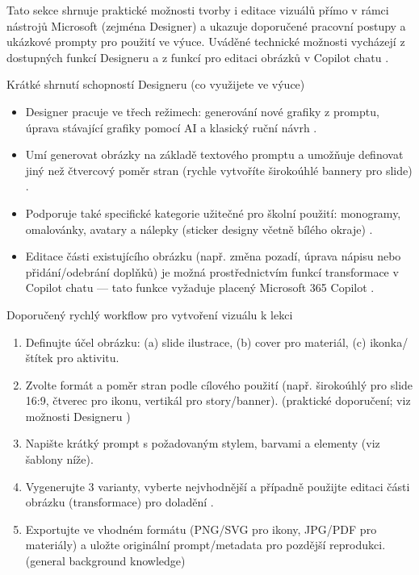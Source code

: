 Tato sekce shrnuje praktické možnosti tvorby i editace vizuálů přímo v rámci nástrojů Microsoft (zejména Designer) a ukazuje doporučené pracovní postupy a ukázkové prompty pro použití ve výuce. Uváděné technické možnosti vycházejí z dostupných funkcí Designeru a z funkcí pro editaci obrázků v Copilot chatu \cite{kb_ai_101_tipu_pdf_04e4a115_page_51_1,kb_ai_101_tipu_pdf_04e4a115_page_52_2}.

Krátké shrnutí schopností Designeru (co využijete ve výuce)
\begin{itemize}
  \item Designer pracuje ve třech režimech: generování nové grafiky z promptu, úprava stávající grafiky pomocí AI a klasický ruční návrh \cite{kb_ai_101_tipu_pdf_04e4a115_page_51_1}.
  \item Umí generovat obrázky na základě textového promptu a umožňuje definovat jiný než čtvercový poměr stran (rychle vytvoříte širokoúhlé bannery pro slide) \cite{kb_ai_101_tipu_pdf_04e4a115_page_51_1}.
  \item Podporuje také specifické kategorie užitečné pro školní použití: monogramy, omalovánky, avatary a nálepky (sticker designy včetně bílého okraje) \cite{kb_ai_101_tipu_pdf_04e4a115_page_51_1}.
  \item Editace části existujícího obrázku (např. změna pozadí, úprava nápisu nebo přidání/odebrání doplňků) je možná prostřednictvím funkcí transformace v Copilot chatu — tato funkce vyžaduje placený Microsoft 365 Copilot \cite{kb_ai_101_tipu_pdf_04e4a115_page_52_2}.
\end{itemize}

Doporučený rychlý workflow pro vytvoření vizuálu k lekci
\begin{enumerate}
  \item Definujte účel obrázku: (a) slide ilustrace, (b) cover pro materiál, (c) ikonka/štítek pro aktivitu.
  \item Zvolte formát a poměr stran podle cílového použití (např. širokoúhlý pro slide 16:9, čtverec pro ikonu, vertikál pro story/banner). (praktické doporučení; viz možnosti Designeru \cite{kb_ai_101_tipu_pdf_04e4a115_page_51_1})
  \item Napište krátký prompt s požadovaným stylem, barvami a elementy (viz šablony níže).
  \item Vygenerujte 3 varianty, vyberte nejvhodnější a případně použijte editaci části obrázku (transformace) pro doladění \cite{kb_ai_101_tipu_pdf_04e4a115_page_52_2}.
  \item Exportujte ve vhodném formátu (PNG/SVG pro ikony, JPG/PDF pro materiály) a uložte originální prompt/metadata pro pozdější reprodukci. (general background knowledge)
\end{enumerate}

